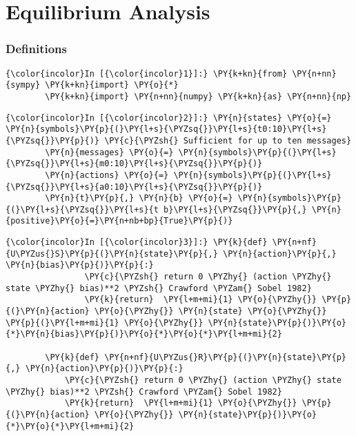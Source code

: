    
\chapter{Equilibrium Analysis}
\label{Equilibrium Analysis}

    
    \subsection{Definitions}\label{definitions}

    \begin{Verbatim}[commandchars=\\\{\}]
{\color{incolor}In [{\color{incolor}1}]:} \PY{k+kn}{from} \PY{n+nn}{sympy} \PY{k+kn}{import} \PY{o}{*}
        \PY{k+kn}{import} \PY{n+nn}{numpy} \PY{k+kn}{as} \PY{n+nn}{np}
\end{Verbatim}

    \begin{Verbatim}[commandchars=\\\{\}]
{\color{incolor}In [{\color{incolor}2}]:} \PY{n}{states} \PY{o}{=} \PY{n}{symbols}\PY{p}{(}\PY{l+s}{\PYZsq{}}\PY{l+s}{t0:10}\PY{l+s}{\PYZsq{}}\PY{p}{)} \PY{c}{\PYZsh{} Sufficient for up to ten messages}
        \PY{n}{messages} \PY{o}{=} \PY{n}{symbols}\PY{p}{(}\PY{l+s}{\PYZsq{}}\PY{l+s}{m0:10}\PY{l+s}{\PYZsq{}}\PY{p}{)}
        \PY{n}{actions} \PY{o}{=} \PY{n}{symbols}\PY{p}{(}\PY{l+s}{\PYZsq{}}\PY{l+s}{a0:10}\PY{l+s}{\PYZsq{}}\PY{p}{)}
        \PY{n}{t}\PY{p}{,} \PY{n}{b} \PY{o}{=} \PY{n}{symbols}\PY{p}{(}\PY{l+s}{\PYZsq{}}\PY{l+s}{t b}\PY{l+s}{\PYZsq{}}\PY{p}{,} \PY{n}{positive}\PY{o}{=}\PY{n+nb+bp}{True}\PY{p}{)}
\end{Verbatim}

    \begin{Verbatim}[commandchars=\\\{\}]
{\color{incolor}In [{\color{incolor}3}]:} \PY{k}{def} \PY{n+nf}{U\PYZus{}S}\PY{p}{(}\PY{n}{state}\PY{p}{,} \PY{n}{action}\PY{p}{,} \PY{n}{bias}\PY{p}{)}\PY{p}{:}
                \PY{c}{\PYZsh{} return 0 \PYZhy{} (action \PYZhy{} state \PYZhy{} bias)**2 \PYZsh{} Crawford \PYZam{} Sobel 1982}
                \PY{k}{return}  \PY{l+m+mi}{1} \PY{o}{\PYZhy{}} \PY{p}{(}\PY{n}{action} \PY{o}{\PYZhy{}} \PY{n}{state} \PY{o}{\PYZhy{}} \PY{p}{(}\PY{l+m+mi}{1} \PY{o}{\PYZhy{}} \PY{n}{state}\PY{p}{)}\PY{o}{*}\PY{n}{bias}\PY{p}{)}\PY{o}{*}\PY{o}{*}\PY{l+m+mi}{2}
            
        \PY{k}{def} \PY{n+nf}{U\PYZus{}R}\PY{p}{(}\PY{n}{state}\PY{p}{,} \PY{n}{action}\PY{p}{)}\PY{p}{:}
            \PY{c}{\PYZsh{} return 0 \PYZhy{} (action \PYZhy{} state \PYZhy{} bias)**2 \PYZsh{} Crawford \PYZam{} Sobel 1982}
            \PY{k}{return}  \PY{l+m+mi}{1} \PY{o}{\PYZhy{}} \PY{p}{(}\PY{n}{action} \PY{o}{\PYZhy{}} \PY{n}{state}\PY{p}{)}\PY{o}{*}\PY{o}{*}\PY{l+m+mi}{2}
\end{Verbatim}

